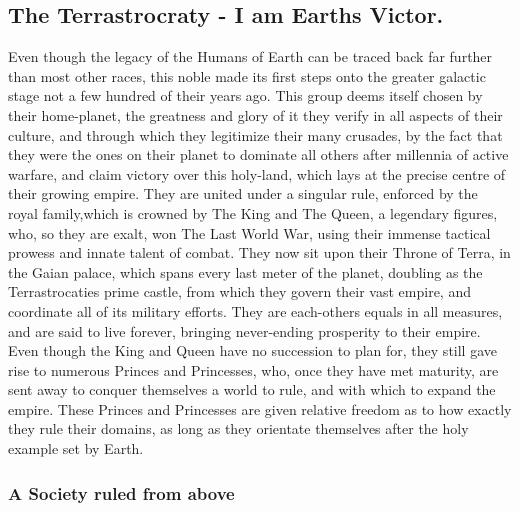 \documentclass[a4paper,12pt]{book}
\begin{document}
\subsection{The Terrastrocraty -  I am Earths Victor.}
Even though the legacy of the Humans of Earth can be traced back far further than most other races, this noble made its first steps onto the greater galactic stage not a few hundred of their years ago. This group deems itself chosen by their home-planet, the greatness and glory of it they verify in all aspects of their culture, and through which they legitimize their many crusades, by the fact that they were the ones on their planet to dominate all others after millennia of active warfare, and claim victory over this holy-land, which lays at the precise centre of their growing empire. They are united under a singular rule, enforced by the royal family,which is crowned by The King and The Queen, a legendary figures, who, so they are exalt, won The Last World War, using their immense tactical prowess and innate talent of combat. They now sit upon their Throne of Terra, in the Gaian palace, which spans every last meter of the planet, doubling as the Terrastrocaties prime castle, from which they govern their vast empire, and coordinate all of its military efforts. They are each-others equals in all  measures, and are said to live forever, bringing never-ending prosperity to their empire. Even though the King and Queen have no succession to plan for, they still gave rise to numerous Princes and Princesses, who, once they have met maturity, are sent away to conquer themselves a world to rule, and with which to expand the empire. These Princes and Princesses are given relative freedom as to how exactly they rule their domains, as long as they orientate themselves after the holy example set by Earth. \\

\subsubsection*{A Society ruled from above}
\end{document}
